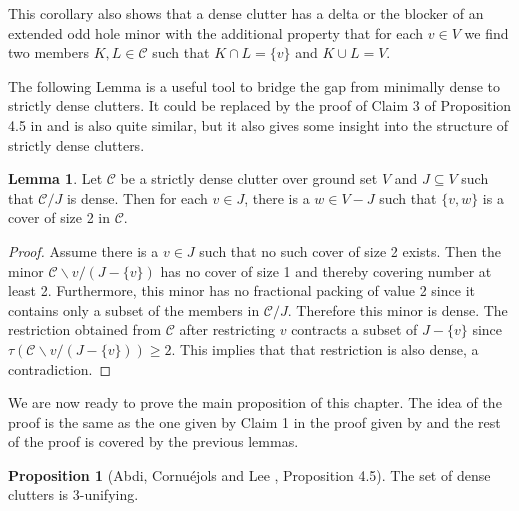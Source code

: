 \documentclass[a4paper, 12pt]{scrbook}
\theoremstyle{definition}
\newtheorem{lemma}[theorem]{Lemma}
\newtheorem{proposition}[theorem]{Proposition}
\begin{document}
   This corollary also shows that a dense clutter has a delta or the blocker of an extended odd hole minor with the additional property that for each $v \in V$ we find two members $K, L \in \mathcal{C}$ such that $K \cap L = \{v\}$ and $K\cup L=V$.

   The following Lemma is a useful tool to bridge the gap from minimally dense to strictly dense clutters. It could be replaced by the proof of Claim 3 of Proposition 4.5 in \cite{restrictions} and is also quite similar, but it also gives some insight into the structure of strictly dense clutters.
   \begin{lemma}\label{covers}
       Let $\mathcal{C}$ be a strictly dense clutter over ground set $V$ and $J \subseteq V$ such that $\mathcal{C} / J$ is dense.
       Then for each $v \in J$, there is a $w \in V-J$ such that $\{v,w\}$ is a cover of size 2 in $\mathcal{C}$.
   \end{lemma}

   \begin{proof}
       Assume there is a $v \in J$ such that no such cover of size 2 exists.
       Then the minor $\mathcal{C} \backslash v/ (J-\{v\})$ has no cover of size 1 and thereby covering number at least 2.
       Furthermore, this minor has no fractional packing of value 2 since it contains only a subset of the members in $\mathcal{C} / J$.
       Therefore this minor is dense.
       The restriction obtained from $\mathcal{C}$ after restricting $v$ contracts a subset of $J-\{v\}$ since $\tau(\mathcal{C} \backslash v/ (J-\{v\}))\geq 2$.
       This implies that that restriction is also dense, a contradiction.
   \end{proof}

   We are now ready to prove the main proposition of this chapter.
   The idea of the proof is the same as the one given by Claim 1 in the proof given by \cite{restrictions} and the rest of the proof is covered by the previous lemmas.
   \begin{proposition}[Abdi, Cornuéjols and Lee \cite{restrictions}, Proposition 4.5]
       The set of dense clutters is 3-unifying.
   \end{proposition}
\end{document}
